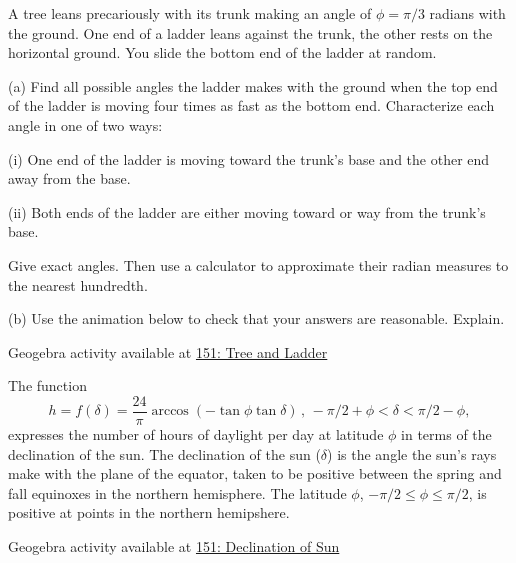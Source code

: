 \documentclass{ximera}
\begin{document}
\begin{question}  \label{QMMnd6793}
A tree leans precariously with its trunk making an angle of $\phi = \pi/3$ radians with the ground. One end of a ladder leans against the trunk, the other rests on the horizontal ground. You slide the bottom end of the ladder at random.

(a) Find all possible angles the ladder makes with the ground when the top end of the ladder is moving four times as fast as the bottom end. Characterize each angle in one of two ways:

(i) One end of the ladder is moving toward the trunk's base and the other end away from the base.

(ii) Both ends of the ladder are either moving toward or way from the trunk's base.

Give exact angles. Then use a calculator to approximate their radian measures to the nearest hundredth.

(b) Use the animation below to check that your answers are reasonable. Explain.


\begin{onlineOnly}
    \begin{center}
\end{center}
\end{onlineOnly}

Geogebra activity available at \href{https://www.desmos.com/calculator/2ppctyby1m}{151: Tree and Ladder}

\end{question}


\begin{question}  \label{Q:er43455}
The function
\[
    h = f(\delta) = \frac{24}{\pi} \arccos(-\tan\phi \tan\delta) \, , \, -\pi/2+\phi < \delta < \pi/2-\phi ,
\]
expresses the number of hours of daylight per day at latitude $\phi$ in terms of the declination of the sun. The declination of the sun ($\delta$) is the angle the sun's rays make with the plane of the equator, taken to be positive between the spring and fall equinoxes in the northern hemisphere. The latitude $\phi$, $-\pi/2 \leq \phi \leq \pi/2$, is positive at points in the northern hemipshere.

\begin{onlineOnly}
    \begin{center}
\end{center}
\end{onlineOnly}

Geogebra activity available at \href{https://www.geogebra.org/classic/yxpe8usp}{151: Declination of Sun}




\end{question}
\end{document}
